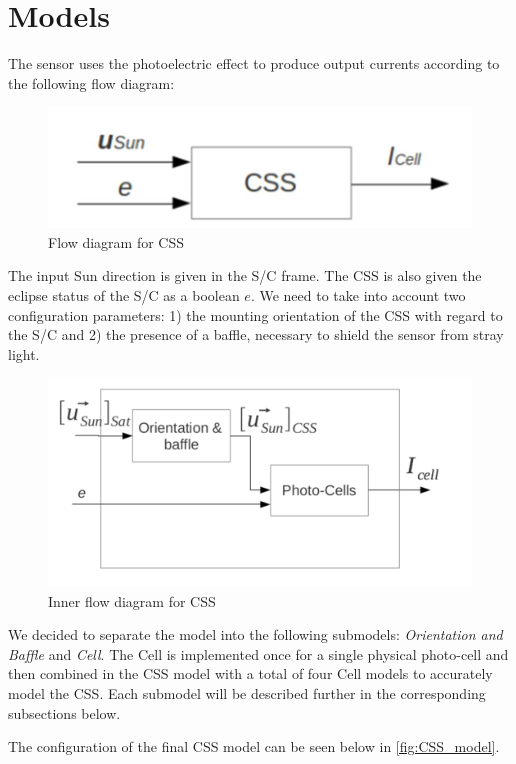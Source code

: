 \section{Models}
\label{sec:models}

The sensor uses the photoelectric effect to produce output currents according to the following flow diagram:
\begin{figure}[H]
    \centering
    \includegraphics[width=0.5\linewidth]{doc//Graphics/sun_sensor_flowchart.png}
    \caption{Flow diagram for CSS}
    \label{fig:sun_sensor_model}
\end{figure}

The input Sun direction is given in the S/C frame. 
The CSS is also given the eclipse status of the 
S/C as a boolean $e$.
We need to take into account two configuration parameters: 1) the mounting orientation of the CSS with regard to the S/C and 2) the presence of a baffle, necessary to shield the sensor from stray light. 

\begin{figure}[H]
    \centering
    \includegraphics[width=0.75\linewidth]{Graphics/photo_cells_flowchart.png}
    \caption{Inner flow diagram for CSS}
    \label{fig:sun_sensor_inner_model}
\end{figure}

We decided to separate the model into the following submodels: \textit{Orientation and Baffle} and \textit{Cell}.
The Cell is implemented once for a single physical photo-cell and then combined in the CSS model with a total of four Cell models to accurately model the CSS.
Each submodel will be described further in the corresponding subsections below.

The configuration of the final CSS model can be seen below in \autoref{fig:CSS_model}.

